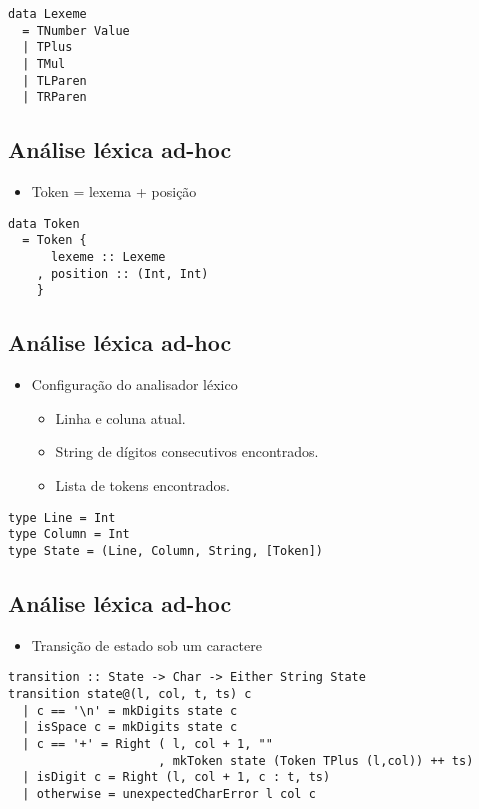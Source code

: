 \documentclass[11pt]{article}
\begin{document}
\begin{verbatim}
data Lexeme  
  = TNumber Value  
  | TPlus 
  | TMul
  | TLParen
  | TRParen 
\end{verbatim}
\subsection*{Análise léxica ad-hoc}
\label{sec:org2a46463}

\begin{itemize}
\item Token = lexema + posição
\end{itemize}

\begin{verbatim}
data Token 
  = Token {
      lexeme :: Lexeme
    , position :: (Int, Int)
    } 
\end{verbatim}
\subsection*{Análise léxica ad-hoc}
\label{sec:org6962984}

\begin{itemize}
\item Configuração do analisador léxico
\begin{itemize}
\item Linha e coluna atual.
\item String de dígitos consecutivos encontrados.
\item Lista de tokens encontrados.
\end{itemize}
\end{itemize}

\begin{verbatim}
type Line = Int 
type Column = Int
type State = (Line, Column, String, [Token])
\end{verbatim}
\subsection*{Análise léxica ad-hoc}
\label{sec:org08d3ade}

\begin{itemize}
\item Transição de estado sob um caractere
\end{itemize}

\begin{verbatim}
transition :: State -> Char -> Either String State
transition state@(l, col, t, ts) c 
  | c == '\n' = mkDigits state c 
  | isSpace c = mkDigits state c 
  | c == '+' = Right ( l, col + 1, ""
                     , mkToken state (Token TPlus (l,col)) ++ ts)
  | isDigit c = Right (l, col + 1, c : t, ts)
  | otherwise = unexpectedCharError l col c 
\end{verbatim}
\end{document}
